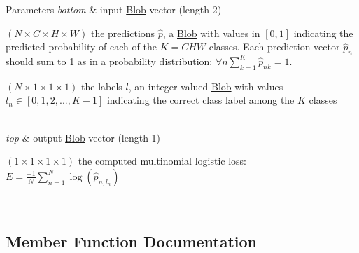 \begin{DoxyParams}{Parameters}
{\em bottom} & input \mbox{\hyperlink{classcaffe_1_1_blob}{Blob}} vector (length 2)
\begin{DoxyEnumerate}
\item $ (N \times C \times H \times W) $ the predictions $ \hat{p} $, a \mbox{\hyperlink{classcaffe_1_1_blob}{Blob}} with values in $ [0, 1] $ indicating the predicted probability of each of the $ K = CHW $ classes. Each prediction vector $ \hat{p}_n $ should sum to 1 as in a probability distribution\+: $ \forall n \sum\limits_{k=1}^K \hat{p}_{nk} = 1 $.
\item $ (N \times 1 \times 1 \times 1) $ the labels $ l $, an integer-\/valued \mbox{\hyperlink{classcaffe_1_1_blob}{Blob}} with values $ l_n \in [0, 1, 2, ..., K - 1] $ indicating the correct class label among the $ K $ classes 
\end{DoxyEnumerate}\\
\hline
{\em top} & output \mbox{\hyperlink{classcaffe_1_1_blob}{Blob}} vector (length 1)
\begin{DoxyEnumerate}
\item $ (1 \times 1 \times 1 \times 1) $ the computed multinomial logistic loss\+: $ E = \frac{-1}{N} \sum\limits_{n=1}^N \log(\hat{p}_{n,l_n}) $ 
\end{DoxyEnumerate}\\
\hline
\end{DoxyParams}


\subsection{Member Function Documentation}
\mbox{\label{classcaffe_1_1_multinomial_logistic_loss_layer_a817e9cb16c4af367edf6941f6009a74d}} 
